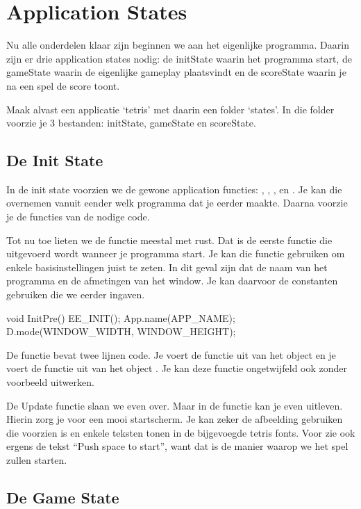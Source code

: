 \chapter{Application States}
Nu alle onderdelen klaar zijn beginnen we aan het eigenlijke programma. Daarin zijn er drie application states nodig: de initState waarin het programma start, de gameState waarin de eigenlijke gameplay plaatsvindt en de scoreState waarin je na een spel de score toont.

Maak alvast een applicatie `tetris' met daarin een folder `states'. In die folder voorzie je 3 bestanden: initState, gameState en scoreState.

\section{De Init State}

In de init state voorzien we de gewone application functies: , , ,  en . Je kan die overnemen vanuit eender welk programma dat je eerder maakte. Daarna voorzie je de functies van de nodige code.

Tot nu toe lieten we de  functie meestal met rust. Dat is de eerste functie die uitgevoerd wordt wanneer je programma start. Je kan die functie gebruiken om enkele basisinstellingen juist te zeten. In dit geval zijn dat de naam van het programma en de afmetingen van het window. Je kan daarvoor de constanten gebruiken die we eerder ingaven.

\begin{code}
void InitPre()
{
   EE_INIT();
   App.name(APP_NAME);
   D.mode(WINDOW_WIDTH, WINDOW_HEIGHT);  
}
\end{code}

De  functie bevat twee lijnen code. Je voert de  functie uit van het object  en je voert de  functie uit van het object . Je kan deze functie ongetwijfeld ook zonder voorbeeld uitwerken.

De Update functie slaan we even over. Maar in de  functie kan je even uitleven. Hierin zorg je voor een mooi startscherm. Je kan zeker de afbeelding gebruiken die voorzien is en enkele teksten tonen in de bijgevoegde tetris fonts. Voor zie ook ergens de tekst ``Push space to start'', want dat is de manier waarop we het spel zullen starten.


\section{De Game State}

